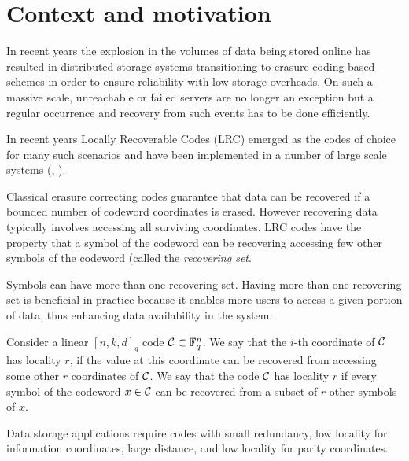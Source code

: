 \chapter{Context and motivation}

In recent years the explosion in the volumes of data being stored online has resulted in distributed storage systems transitioning to erasure coding based schemes in order to ensure reliability with low storage overheads. On such a massive scale, unreachable or failed servers are no longer an exception but a regular occurrence and recovery from such events has to be done efficiently.

In recent years Locally Recoverable Codes (LRC) emerged as the codes of choice for many such scenarios and have been implemented in a number of large scale systems (\cite{azure}, \cite{hadoop}).

Classical erasure correcting codes guarantee that data can be recovered if a bounded number of codeword coordinates is erased. However recovering data typically involves accessing all surviving coordinates. LRC codes have the property that a symbol of the codeword can be recovering accessing few other symbols of the codeword (called the \textit{recovering set}.

Symbols can have more than one recovering set. Having more than one recovering set is beneficial in practice because it enables more users to access a given portion of data, thus enhancing data availability in the system.

Consider a linear $[n,k,d]_q$ code ${\mathcal C} \subset {\mathbb F}_q^n$. We say that the $i$-th coordinate of ${\mathcal C}$ has locality $r$, if the value at this coordinate can be recovered from accessing some other $r$ coordinates of ${\mathcal C}$. We say that the code ${\mathcal C}$ has locality $r$ if every symbol of the codeword $x \in {\mathcal C}$ can be recovered from a subset of $r$ other symbols of $x$.

Data storage applications require codes with small redundancy, low locality for information coordinates, large distance, and low locality for parity coordinates.


